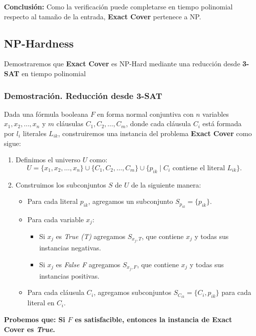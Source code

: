 \documentclass[a4paper,12pt]{article}
\begin{document}
\textbf{Conclusión:} Como la verificación puede completarse en tiempo polinomial respecto al tamaño de la entrada, \textbf{Exact Cover} pertenece a NP.

\subsection{NP-Hardness}
Demostraremos que \textbf{Exact Cover} es NP-Hard mediante una reducción desde \textbf{3-SAT} en tiempo polinomial 

\subsubsection{Demostración. Reducción desde 3-SAT}
Dada una fórmula booleana $F$ en forma normal conjuntiva con $n$ variables $x_1, x_2, \dots, x_n$ y $m$ cláusulas $C_1, C_2, \dots, C_m$, donde cada cláusula $C_i$ está formada por $l_i$ literales $L_{ik}$, construiremos una instancia del problema \textbf{Exact Cover} como sigue:
\begin{enumerate}
    \item Definimos el universo $U$ como:
    \[
    U = \{x_1, x_2, \dots, x_n\} \cup \{C_1, C_2, \dots, C_m\} \cup \{p_{ik} \mid C_i \text{ contiene el literal } L_{ik}\}.
    \]
    \item Construimos los subconjuntos $S$ de $U$ de la siguiente manera:
    \begin{itemize}
        \item Para cada literal $p_{ik}$, agregamos un subconjunto $S_{p_{ik}} = \{p_{ik}\}$.
        \item Para cada variable $x_j$:
        \begin{itemize}
            \item Si $x_j$ es \textit{True (T)} agregamos $S_{x_j,T}$, que contiene $x_j$ y todas sus instancias negativas.
            \item Si $x_j$ es \textit{False {F}} agregamos $S_{x_j,F}$, que contiene $x_j$ y todas sus instancias positivas.
        \end{itemize}
        \item Para cada cláusula $C_i$, agregamos subconjuntos $S_{C_{ik}} = \{C_i, p_{ik}\}$ para cada literal en $C_i$.
    \end{itemize}
\end{enumerate}

\textbf{Probemos que: Si $F$ es satisfacible, entonces la instancia de \textbf{Exact Cover} es \textit{True}.}
\end{document}
